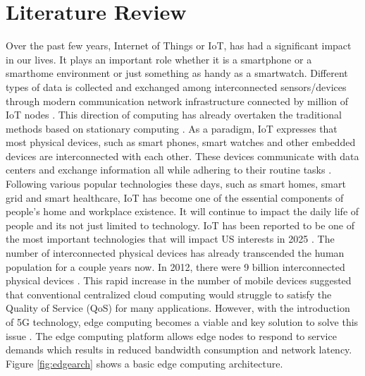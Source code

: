 \chapter{Literature Review}
Over the past few years, Internet of Things or IoT, has had a significant impact in our lives.
It plays an important role whether it is a smartphone or a smarthome environment or just something 
as handy as a smartwatch. Different types of data is collected and exchanged among interconnected 
sensors/devices through modern communication network infrastructure connected by million of 
IoT nodes \cite{8123913,7598173,7879243,6774858,10.1145/2872332}. This direction of computing 
has already overtaken the traditional methods based on stationary computing \cite{8058399}. 
As a paradigm, IoT expresses that most physical devices, such as smart phones, smart watches and 
other embedded devices are interconnected with each other. These devices communicate with data 
centers and exchange information \textemdash all while adhering to their routine tasks \cite{7879243}. \\
Following various popular technologies these days, such as smart homes, smart grid and smart healthcare, 
IoT has become one of the essential components of people's home and workplace existence. It will 
continue to impact the daily life of people and its not just limited to technology. IoT has been reported 
to be one of the most important technologies that will impact US interests in 2025 \cite{7879243}. 
The number of interconnected physical devices has already transcended the human population for a couple 
years now. In 2012, there were 9 billion interconnected physical devices \cite{8058399}. This rapid increase 
in the number of mobile devices suggested that conventional centralized cloud computing would struggle 
to satisfy the Quality of Service (QoS) for many applications. However, with the introduction of 5G 
technology, edge computing becomes a viable and key solution to solve this issue \cite{7568592,7414384,6568922}. 
The edge computing platform allows edge nodes to respond to service demands which results in reduced 
bandwidth consumption and network latency. Figure \ref{fig:edgearch} shows a basic edge computing architecture. \\ 
